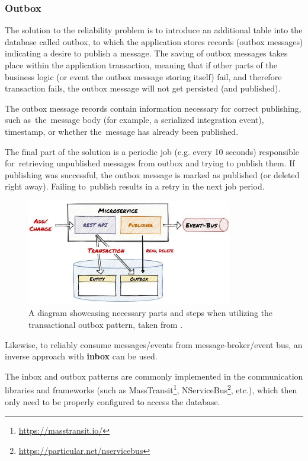 \subsubsection{Outbox}
The solution to the reliability problem is to introduce an additional table into the database called outbox, to which the application stores records (outbox messages) indicating a desire to publish a message. The saving of outbox messages takes place within the application transaction, meaning that if other parts of the business logic (or event the outbox message storing itself) fail, and therefore transaction fails, the outbox message will not get persisted (and published).

The outbox message records contain information necessary for correct publishing, such as~the~message body (for example, a serialized integration event), timestamp, or whether the~message has already been published. 

The final part of the solution is a periodic job (e.g. every 10 seconds) responsible for~retrieving unpublished messages from outbox and trying to publish them. If publishing was successful, the outbox message is marked as published (or deleted right away). Failing to~publish results in a retry in the next job period.

\begin{figure} [H]
    \centering
    \includegraphics[width=0.8\textwidth]{figures/outbox.png}
    \caption{A diagram showcasing necessary parts and steps when utilizing the transactional outbox pattern, taken from \cite{mehmet_ozkaya:outbox}.}
    \label{fig:arch:outbox}
\end{figure}

Likewise, to reliably consume messages/events from message-broker/event bus, an inverse approach with \textbf{inbox} can be used.

The inbox and outbox patterns are commonly implemented in the communication libraries and frameworks (such as MassTransit\footnote{\url{https://masstransit.io/}}, NServiceBus\footnote{\url{https://particular.net/nservicebus}}, etc.), which then only need to be properly configured to access the database.

